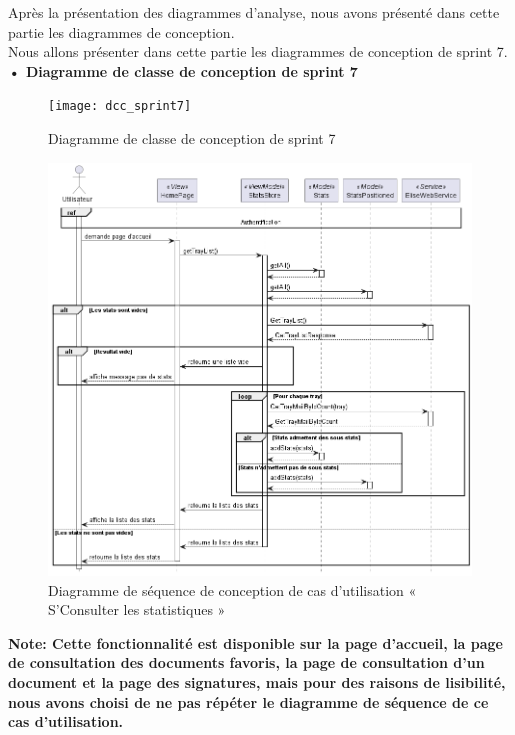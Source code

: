 Après la présentation des diagrammes d'analyse, nous avons présenté dans cette partie les diagrammes de conception.\\ 
Nous allons présenter dans cette partie les diagrammes de conception de sprint 7. \\
\textbf{•	Diagramme de classe de conception de sprint 7}

\begin{figure}[H]
  \centering
  \texttt{[image: dcc\_sprint7]}
  \caption{Diagramme de classe de conception de sprint 7}
  \label{fig:class_diagram_5}
\end{figure}


\begin{figure}[H]
  \centering
  \includegraphics[width=1\textwidth]{out/diagrams/sprint7/sequence_view_stats/sequence_view_stats}
  \caption{Diagramme de séquence de conception de cas d'utilisation « S'Consulter les statistiques »}
  \label{fig:sequence_conception_consulter_statistiques}
\end{figure}

\textbf{Note: Cette fonctionnalité est disponible sur la page d'accueil, la page de consultation des documents favoris, la page de consultation d'un document et la page des signatures, mais pour des raisons de lisibilité, nous avons choisi de ne pas répéter le diagramme de séquence de ce cas d'utilisation.}

